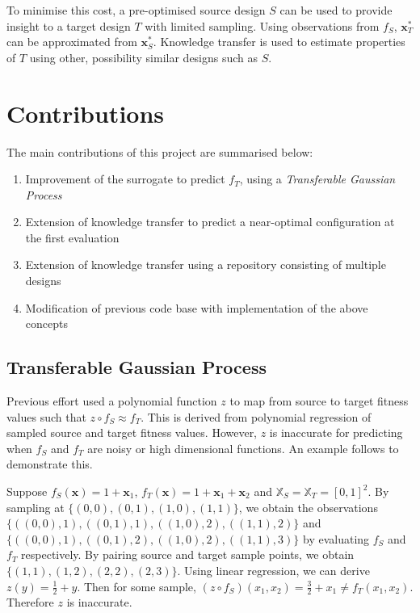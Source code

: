 \documentclass[10pt,a4paper]{article}
\begin{document}
To minimise this cost, a pre-optimised source design $S$ can be used to provide insight to a target design $T$ with limited sampling. Using observations from $f_S$, $\mathbf{x}_T^*$ can be approximated from $\mathbf{x}_S^*$. Knowledge transfer is used to estimate properties of $T$ using other, possibility similar designs such as $S$.

\section{Contributions}

The main contributions of this project are summarised below:
\begin{enumerate}
\item Improvement of the surrogate to predict $f_T$, using a \emph{Transferable Gaussian Process}
\item Extension of knowledge transfer to predict a near-optimal configuration at the first evaluation
\item Extension of knowledge transfer using a repository consisting of multiple designs
\item Modification of previous code base\cite{Nicholson2015} with implementation of the above concepts
\end{enumerate}
\subsection{Transferable Gaussian Process}

Previous effort\cite{Kurek2016} used a polynomial function $z$ to map from source to target fitness values such that $z\circ f_S\approx f_T$. This is derived from polynomial regression of sampled source and target fitness values. However, $z$ is inaccurate for predicting when $f_S$ and $f_T$ are noisy or high dimensional functions. An example follows to demonstrate this.

Suppose $f_S(\mathbf{x})=1+\mathbf{x}_1$, $f_T(\mathbf{x})=1+\mathbf{x}_1+\mathbf{x}_2$ and $\mathbb{X}_S=\mathbb{X}_T=[0,1]^2$. By sampling at $\{(0,0),(0,1),(1,0),(1,1)\}$, we obtain the observations $\{((0,0),1),\allowbreak((0,1),1),((1,0),2),((1,1),2)\}$ and $\{((0,0),1),((0,1),2),((1,0),2),((1,1),3)\}$ by evaluating $f_S$ and $f_T$ respectively. By pairing source and target sample points, we obtain $\{(1,1),(1,2),(2,2),(2,3)\}$. Using linear regression, we can derive $z(y)=\frac{1}{2}+y$. Then for some sample, $(z\circ f_S)(x_1,x_2)=\frac{3}{2}+x_1\not=f_T(x_1,x_2)$. Therefore $z$ is inaccurate.
\end{document}
